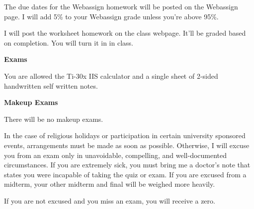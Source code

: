 \documentclass{article}
\begin{document}
The due dates for the Webassign homework will be posted on the Webassign page.
I will add 5\% to your Webassign grade unless you're above 95\%.

I will post the worksheet homework on the class webpage. It'll be graded based
on completion. You will turn it in in class.

\textbf{Exams}

You are allowed the Ti-30x IIS calculator and a single sheet of 2-sided
handwritten self written notes.

\textbf{Makeup Exams}

There will be no makeup exams.

In the case of religious holidays or participation in certain university
sponsored events, arrangements must be made as soon as possible. Otherwise, I
will excuse you from an exam only in unavoidable, compelling, and
well-documented circumstances. If you are extremely sick, you must bring me a
doctor's note that states you were incapable of taking the quiz or exam. If you
are excused from a midterm, your other midterm and final will be weighed more
heavily.

If you are not excused and you miss an exam, you will receive a zero.
\end{document}
